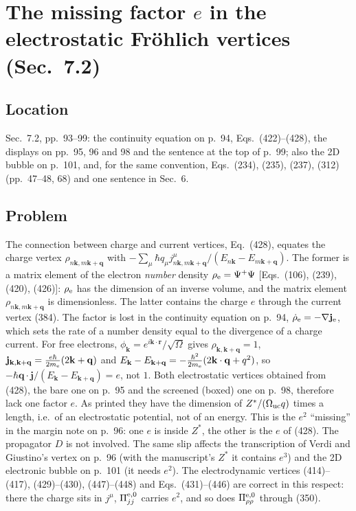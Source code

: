 \documentclass[11pt]{article}
\begin{document}
\section{The missing factor $e$ in the electrostatic Fr\"ohlich vertices (Sec.~7.2)}\label{sec:efactor}

\subsection{Location}
Sec.~7.2, pp.~93--99: the continuity equation on p.~94, Eqs.~(422)--(428), the displays on pp.~95, 96
and 98 and the sentence at the top of p.~99; also the 2D bubble on p.~101, and, for the same convention,
Eqs.~(234), (235), (237), (312) (pp.~47--48, 68) and one sentence in Sec.~6.

\subsection{Problem}
The connection between charge and current vertices, Eq.~(428), equates the charge vertex
$\rho_{n\mathbf k,m\mathbf k+\mathbf q}$ with $-\sum_\mu\hbar q_\mu j^\mu_{n\mathbf k,m\mathbf k+\mathbf q}/
(E_{n\mathbf k}-E_{m\mathbf k+\mathbf q})$. The former is a matrix element of the electron \emph{number}
density $\rho_{\rm e}=\Psi^+\Psi$ [Eqs.~(106), (239), (420), (426)]: $\rho_{\rm e}$ has the dimension of an
inverse volume, and the matrix element $\rho_{n\mathbf k,m\mathbf k+\mathbf q}$ is dimensionless. The latter
contains the charge $e$ through the current vertex (384). The factor is lost in the continuity equation
on p.~94, $\dot\rho_{\rm e}=-\nabla\mathbf j_{\rm e}$, which sets the rate of a number density equal to the
divergence of a charge current. For free electrons, $\phi_{\mathbf k}=e^{i\mathbf k\cdot\mathbf r}/\sqrt\Omega$
gives $\rho_{\mathbf k,\mathbf k+\mathbf q}=1$, $\mathbf j_{\mathbf k,\mathbf k+\mathbf q}=\frac{e\hbar}{2m_{\rm e}}
(2\mathbf k+\mathbf q)$ and $E_{\mathbf k}-E_{\mathbf k+\mathbf q}=-\frac{\hbar^2}{2m_{\rm e}}(2\mathbf k\cdot\mathbf q
+q^2)$, so $-\hbar\mathbf q\cdot\mathbf j/(E_{\mathbf k}-E_{\mathbf k+\mathbf q})=e$, not $1$. Both electrostatic
vertices obtained from (428), the bare one on p.~95 and the screened (boxed) one on p.~98, therefore
lack one factor $e$. As printed they have the dimension of $Z^*/(\Omega_{\rm uc}q)$ times a length, i.e.\
of an electrostatic potential, not of an energy. This is the $e^2$ ``missing'' in the margin note on
p.~96: one $e$ is inside $Z^*$, the other is the $e$ of (428). The propagator $D$ is not involved. The
same slip affects the transcription of Verdi and Giustino's vertex on p.~96 (with the manuscript's $Z^*$
it contains $e^3$) and the 2D electronic bubble on p.~101 (it needs $e^2$). The electrodynamic vertices
(414)--(417), (429)--(430), (447)--(448) and Eqs.~(431)--(446) are correct in this respect: there the
charge sits in $j^\mu$, $\Pi^{\rm e,0}_{jj}$ carries $e^2$, and so does $\Pi^{\rm e,0}_{\rho\rho}$ through
(350).
\end{document}
